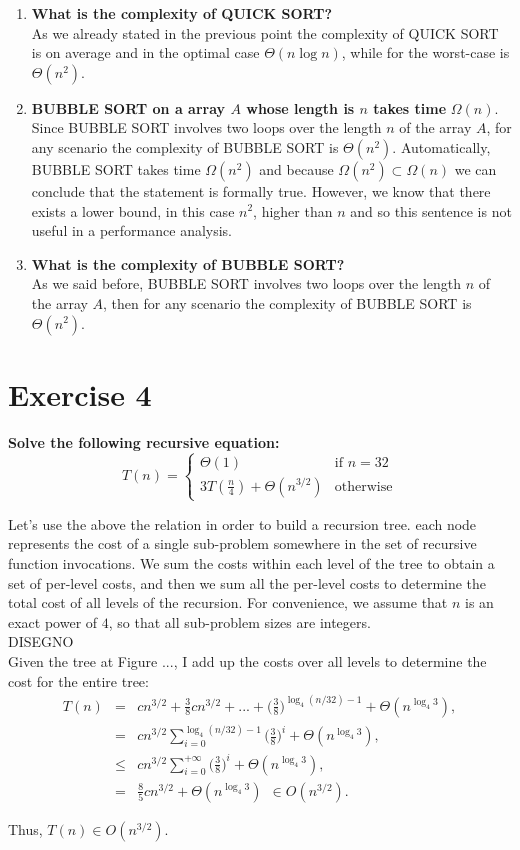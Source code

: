 \documentclass{article}
\begin{document}
\begin{enumerate}[label=(\alph*)]
		\item \textbf{What is the complexity of QUICK SORT?}\\
		As we already stated in the previous point the complexity of QUICK SORT is on average and in the optimal case $\Theta(n\log n)$, while for the worst-case is $\Theta(n^2)$.
		\item \textbf{BUBBLE SORT on a array $A$ whose length is $n$ takes time} $\Omega(n)$.
		Since BUBBLE SORT involves two loops over the length $n$ of the array $A$, for any scenario the complexity of BUBBLE SORT is $\Theta(n^2)$. Automatically, BUBBLE SORT takes time $\Omega(n^2)$ and because $\Omega(n^2) \subset \Omega(n) $ we can conclude that the statement is formally true. However, we know that there exists a lower bound, in this case $n^2$, higher than $n$ and so this sentence is not useful in a performance analysis. 
		\item  \textbf{What is the complexity of BUBBLE SORT?} \\
		As we said before,  BUBBLE SORT involves two loops over the length $n$ of the array $A$, then for any scenario the complexity of BUBBLE SORT is $\Theta(n^2)$. 
	\end{enumerate}

	\section*{Exercise 4}
	\textbf{Solve the following recursive equation:}
	$$
	T(n) = \begin{cases}
			\Theta(1) & \text{if } n= 32 \\
			3T(\frac{n}{4}) + \Theta(n^{3/2}) & \text{otherwise}
			\end{cases} 
	$$
	
	\noindent Let's use the above the relation in order to build a recursion tree.  each node represents the cost of a single sub-problem somewhere in the set of recursive function invocations. We sum the costs within each level of the tree to obtain a set of per-level costs, and then we sum all the per-level costs to determine the total cost of all levels of the recursion. For convenience, we assume that $n$ is an exact power of $4$, so that all sub-problem sizes are integers. \\
	
	
	DISEGNO \\
	
	
	Given the tree at Figure ..., I add up the costs over all levels to determine the cost for the entire tree:
	\begin{eqnarray}
	\nonumber
	T(n) &=& cn^{3/2} + \frac{3}{8} cn^{3/2} + ... + \Bigg( \frac{3}{8} \Bigg)^{\log_4 (n/32)-1} + \Theta(n^{\log_4 3}), \\
	\nonumber
	&=& cn^{3/2} \sum_{i=0}^{\log_4 (n/32)-1} \Bigg( \frac{3}{8} \Bigg)^i + \Theta(n^{\log_4 3}), \\
	\nonumber
	&\leq &   cn^{3/2} \sum_{i=0}^{+\infty} \Bigg( \frac{3}{8} \Bigg)^i + \Theta(n^{\log_4 3}), \\
	\nonumber
	 & = &   \frac{8}{5} cn^{3/2} + \Theta(n^{\log_4 3}) ~ ~ \in O(n^{3/2}) .
	\end{eqnarray}
	
	Thus, $ T(n) \in O(n^{3/2}) $. 
	
\end{document}
